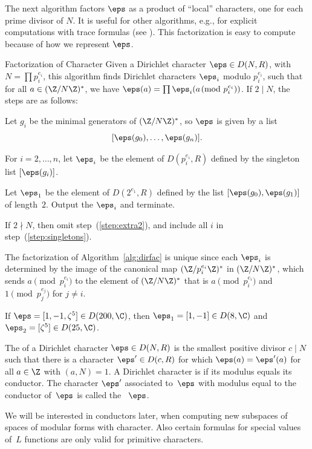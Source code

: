 The next algorithm factors $\eps$ as a product of ``local'' characters,
one for each prime divisor of $N$.  It is useful for other algorithms,
e.g., for explicit computations with trace formulas
(see \cite{hijikata:trace}). This factorization is easy to compute
because of how we represent $\eps$.

\begin{algorithm}{Factorization of Character}\label{alg:dirfac}
Given a Dirichlet character $\eps\in D(N,R)$, with $N=\prod p_i^{e_i}$, 
this algorithm finds Dirichlet characters $\eps_i$ modulo $p_i^{e_i}$, such
that for all $a\in(\Z/N\Z)^*$, we have 
$\eps(a) = \prod \eps_i(a\!\!\pmod{p_i^{e_i}})$.
If $2\mid N$, the steps are as follows:
\begin{steps}
\item Let $g_i$ be the minimal generators of $(\Z/N\Z)^*$, so $\eps$
is given by a list $$[\eps(g_0),\ldots, \eps(g_n)].$$
\item\label{step:singletons} For $i=2,\ldots, n$, let $\eps_i$ be the element of $D(p_i^{e_i},R)$
defined by the singleton list $[\eps(g_i)]$.
\item\label{step:extra2} Let $\eps_1$ be the element of $D(2^{e_1},R)$ defined
by the list $[\eps(g_0), \eps(g_1)]$ of length~$2$.   Output the
$\eps_i$ and terminate.
\end{steps}
If $2\nmid N$, then omit step~(\ref{step:extra2}), and include
all $i$ in step~(\ref{step:singletons}).
\end{algorithm}
The factorization of Algorithm~\ref{alg:dirfac} is unique since each
$\eps_i$ is determined by the image of the canonical map
$(\Z/p_i^{e_i}\Z)^*$ in $(\Z/N\Z)^*$, which sends $a\pmod
{p_i^{e_i}}$ to the element of $(\Z/N\Z)^*$ that is
$a\pmod{p_i^{e_i}}$ and $1 \pmod{p_j^{e_j}}$ for $j\neq i$.

\begin{example}\label{ex:prodlocal}
If $\eps = [1,-1,\zeta^5] \in D(200,\C)$, then 
$\eps_1 = [1,-1]\in D(8,\C)$ and $\eps_2 = [\zeta^5]\in D(25,\C)$.
\end{example}



\begin{definition}[Conductor]\label{defn:conductordir}
The  of a Dirichlet character $\eps\in D(N,R)$
is the smallest positive divisor $c\mid N$ such that 
there is a character $\eps' \in D(c,R)$ for which 
$\eps(a) = \eps'(a)$ for all $a\in\Z$ with $(a,N)=1$.
A Dirichlet character is  if its modulus equals
its conductor.  The character $\eps'$ associated to~$\eps$
with modulus equal to the conductor of~$\eps$ is called
the ~$\eps$.
\end{definition}
We will be interested in conductors later, when computing new
subspaces of spaces of modular forms with character.  Also certain
formulas for special values of~$L$ functions are only valid for
primitive characters.

